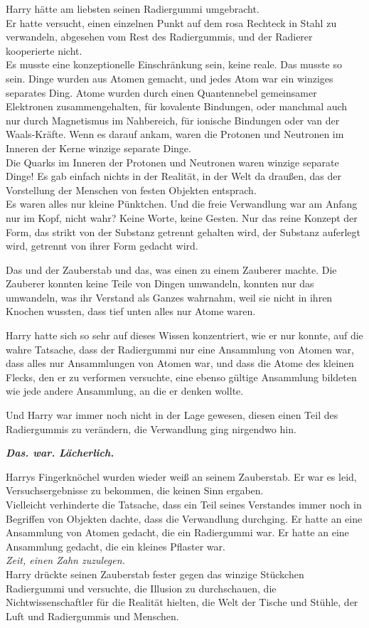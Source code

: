 {Harry hätte am liebsten seinen Radiergummi umgebracht.\\ Er hatte versucht, einen einzelnen Punkt auf dem rosa Rechteck in Stahl zu verwandeln, abgesehen vom Rest des Radiergummis, und der Radierer kooperierte nicht.\\ Es musste eine konzeptionelle Einschränkung sein, keine reale. Das musste so sein. Dinge wurden aus Atomen gemacht, und jedes Atom war ein winziges separates Ding. Atome wurden durch einen Quantennebel gemeinsamer Elektronen zusammengehalten, für kovalente Bindungen, oder manchmal auch nur durch Magnetismus im Nahbereich, für ionische Bindungen oder van der Waals-Kräfte. Wenn es darauf ankam, waren die Protonen und Neutronen im Inneren der Kerne winzige separate Dinge.\\ Die Quarks im Inneren der Protonen und Neutronen waren winzige separate Dinge! Es gab einfach nichts in der Realität, in der Welt da draußen, das der Vorstellung der Menschen von festen Objekten entsprach.\\ Es waren alles nur kleine Pünktchen. Und die freie Verwandlung war am Anfang nur im Kopf, nicht wahr? Keine Worte, keine Gesten. Nur das reine Konzept der Form, das strikt von der Substanz getrennt gehalten wird, der Substanz auferlegt wird, getrennt von ihrer Form gedacht wird.

Das und der Zauberstab und das, was einen zu einem Zauberer machte. Die Zauberer konnten keine Teile von Dingen umwandeln, konnten nur das umwandeln, was ihr Verstand als Ganzes wahrnahm, weil sie nicht in ihren Knochen wussten, dass tief unten alles nur Atome waren.

Harry hatte sich so sehr auf dieses Wissen konzentriert, wie er nur konnte, auf die wahre Tatsache, dass der Radiergummi nur eine Ansammlung von Atomen war, dass alles nur Ansammlungen von Atomen war, und dass die Atome des kleinen Flecks, den er zu verformen versuchte, eine ebenso gültige Ansammlung bildeten wie jede andere Ansammlung, an die er denken wollte.

Und Harry war immer noch nicht in der Lage gewesen, diesen einen Teil des Radiergummis zu verändern, die Verwandlung ging nirgendwo hin.

\textbf{\emph{Das. war. Lächerlich.}}

Harrys Fingerknöchel wurden wieder weiß an seinem Zauberstab. Er war es leid, Versuchsergebnisse zu bekommen, die keinen Sinn ergaben.\\ Vielleicht verhinderte die Tatsache, dass ein Teil seines Verstandes immer noch in Begriffen von Objekten dachte, dass die Verwandlung durchging. Er hatte an eine Ansammlung von Atomen gedacht, die ein Radiergummi war. Er hatte an eine Ansammlung gedacht, die ein kleines Pflaster war.\\ \emph{Zeit, einen Zahn zuzulegen.}\\ Harry drückte seinen Zauberstab fester gegen das winzige Stückchen Radiergummi und versuchte, die Illusion zu durchschauen, die Nichtwissenschaftler für die Realität hielten, die Welt der Tische und Stühle, der Luft und Radiergummis und Menschen.

}
